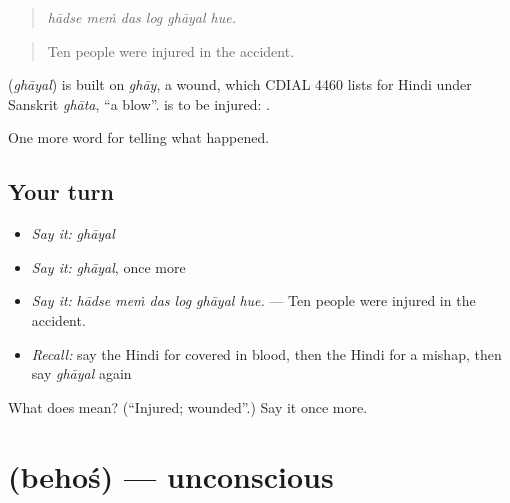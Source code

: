\begin{quote}
     
\end{quote}

\begin{quote}
\emph{hādse meṁ das log ghāyal hue.}
\end{quote}

\begin{quote}
Ten people were injured in the accident.
\end{quote}

\begin{cousinweb}
\textbf{} (\emph{ghāyal}) is built on \emph{ghāy}, a wound, which CDIAL 4460 lists for Hindi under Sanskrit \emph{ghāta}, \textquotedblleft{}a blow\textquotedblright{}. \textbf{ } is to be injured: \textbf{   }.
\end{cousinweb}

\begin{grammarlens}[title={What you've built}]
One more word for telling what happened.
\end{grammarlens}

\subsection*{Your turn}
\begin{itemize}
\raggedright
  \item \emph{Say it:} \emph{ghāyal}
  \item \emph{Say it:} \emph{ghāyal}, once more
  \item \emph{Say it:} \emph{hādse meṁ das log ghāyal hue.} — Ten people were injured in the accident.
  \item \emph{Recall:} say the Hindi for covered in blood, then the Hindi for a mishap, then say \emph{ghāyal} again
\end{itemize}

\begin{tcolorbox}[breakable,colback=teal!4,colframe=teal!35!black,title={Before you move on}]
What does  mean? (\textquotedblleft{}Injured; wounded\textquotedblright{}.) Say it once more.
\end{tcolorbox}
\section[\texorpdfstring{\hi{बेहोश} (behoś)}{बेहोश (behoś)}]{ (behoś) — unconscious}

